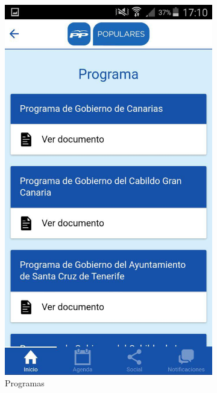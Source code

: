 \begin{figure}[H]
\begin{subfigure}[b]{0.3\textwidth}
                \includegraphics[width=\textwidth]{Media/Captures/ppCanariasProgram.jpg}
                \caption{Programas}
                \label{fig:ppPrograms}
        \end{subfigure}
        ~
        \begin{subfigure}[b]{0.3\textwidth}

\end{subfigure}
\end{figure}
